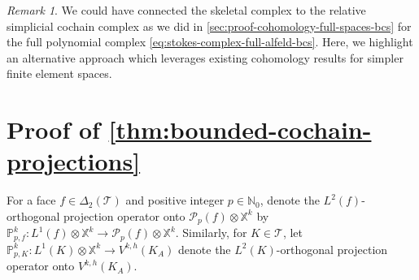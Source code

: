 \documentclass{mcom-l}
\theoremstyle{definition}
\theoremstyle{remark}
\newtheorem{remark}[theorem]{Remark}
\numberwithin{equation}{section}
\newcommand{\mesh}[0]{\mathcal{T}}
\begin{document}
\begin{remark}
	We could have connected the skeletal complex to the 
	relative simplicial cochain complex as we did in 
	\cref{sec:proof-cohomology-full-spaces-bcs} for 
	the full polynomial complex \cref{eq:stokes-complex-full-alfeld-bcs}.
	Here, we highlight an alternative approach which leverages existing 
	cohomology results for simpler finite element spaces.
\end{remark}


\section{Proof of \cref{thm:bounded-cochain-projections}}
\label{sec:proof-bounded-cochain-projections}

For a face $f\in \Delta_2(\mesh)$
and positive integer $p \in \mathbb{N}_0$, 
denote the 
$L^2(f)$-orthogonal projection operator onto 
$\mathcal{P}_p(f) \otimes \mathbb{X}^k$ by 
$\mathbb{P}^k_{p, f} : L^1(f) \otimes \mathbb{X}^k 
\to \mathcal{P}_p(f) \otimes \mathbb{X}^k$. Similarly, for 
$K \in \mesh$, let 
$\mathbb{P}^k_{p, K} : L^1(K) \otimes \mathbb{X}^k \to V^{k, h}(K_A)$
denote the $L^2(K)$-orthogonal projection operator onto $V^{k, h}(K_A)$. \\
\end{document}
